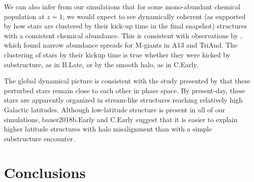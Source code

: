 We can also infer from our simulations that for some mono-abundant chemical population at $z=1$, we would expect to see dynamically coherent (as supported by how stars are clustered by their kick-up time in the final snapshot) structures with a consistent chemical abundance. This is consistent with observations by \citet{bergemann_2018}, which found narrow abundance spreads for M-giants in A13 and TriAnd. The clustering of stars by their kickup time is true whether they were kicked by substructure, as in B.Late, or by the smooth halo, as in C.Early.

The global dynamical picture is consistent with the study presented by \citet{laporte_2019_feathers} that these perturbed stars remain close to each other in phase space. By present-day, these stars are apparently organized in stream-like structures reaching relatively high Galactic latitudes. Although low-latitude structure is present in all of our simulations, bauer2018b.Early and C.Early suggest that it is easier to explain higher latitude structures with halo misalignment than with a simple substructure encounter.



\section{Conclusions}

